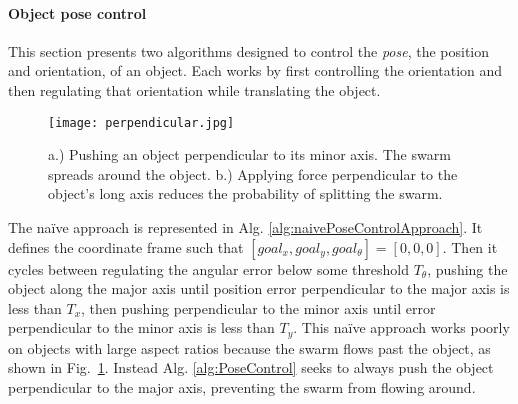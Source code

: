 






\paragraph{Object pose control}
This section presents two algorithms designed to control the \emph{pose}, the position and orientation, of an object.  
Each works by first controlling the orientation and then regulating that orientation while translating the object. 

\begin{figure}
\begin{center}
	\texttt{[image: perpendicular.jpg]}
\end{center}
\vspace{-1em}
\caption{\label{fig:perpendicular} 
a.) Pushing an object perpendicular to its minor axis. The swarm spreads around the object. b.)  Applying force perpendicular to the object's long axis reduces the probability of splitting the swarm.
}
\vspace{-2em}
\end{figure}

The na\"{i}ve approach is represented in Alg. \ref{alg:naivePoseControlApproach}. It defines  the coordinate frame such that $[goal_x, goal_y, goal_{\theta}] = [0,0,0]$.
Then it cycles between regulating the angular error below some threshold $T_{\theta}$,
pushing the object along the major axis until position error perpendicular to the major axis is less than $T_x$, then pushing perpendicular to the minor axis until error perpendicular to the minor axis is less than $T_y$. 
This na\"{i}ve approach works poorly on objects with large aspect ratios because the swarm flows past the object, as shown in Fig.~\ref{fig:perpendicular}. 
Instead Alg. \ref{alg:PoseControl} seeks to always push the object perpendicular to the major axis, preventing the swarm from flowing around. 


